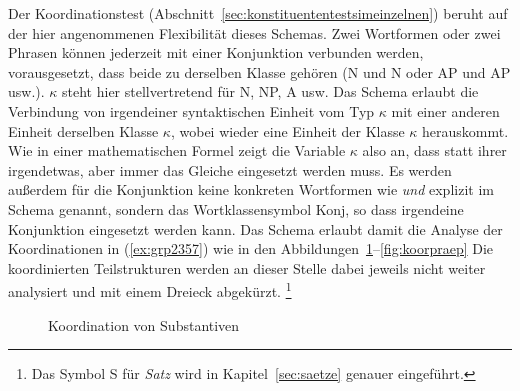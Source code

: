 

Der Koordinationstest (Abschnitt~\ref{sec:konstituententestsimeinzelnen}) beruht auf der hier angenommenen Flexibilität dieses Schemas.
Zwei Wortformen oder zwei Phrasen können jederzeit mit einer Konjunktion verbunden werden, vorausgesetzt, dass beide zu derselben Klasse gehören (N und N oder AP und AP usw.).
$\kappa$ steht hier stellvertretend für N, NP, A usw.
Das Schema erlaubt die Verbindung von irgendeiner syntaktischen Einheit vom Typ $\kappa$ mit einer anderen Einheit derselben Klasse $\kappa$, wobei wieder eine Einheit der Klasse $\kappa$ herauskommt.
Wie in einer mathematischen Formel zeigt die Variable $\kappa$ also an, dass statt ihrer irgendetwas, aber immer das Gleiche eingesetzt werden muss.
Es werden außerdem für die Konjunktion keine konkreten Wortformen wie \textit{und} explizit im Schema genannt, sondern das Wortklassensymbol Konj, so dass irgendeine Konjunktion eingesetzt werden kann.
Das Schema erlaubt damit die Analyse der Koordinationen in (\ref{ex:grp2357}) wie in den Abbildungen~\ref{fig:koorsubst}--\ref{fig:koorpraep}
Die koordinierten Teilstrukturen werden an dieser Stelle dabei jeweils nicht weiter analysiert und mit einem Dreieck abgekürzt.%
\footnote{Das Symbol S für \textit{Satz} wird in Kapitel~\ref{sec:saetze} genauer eingeführt.}

\begin{exe}
  \ex\label{ex:grp2357}
  \begin{xlist}
  \end{xlist}
\end{exe}

\begin{figure}[!htbp]
  \centering
  \caption{Koordination von Substantiven}
  \label{fig:koorsubst}
\end{figure}

